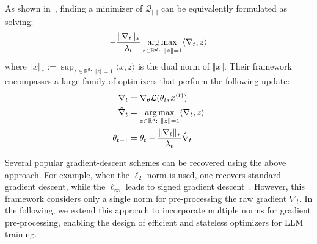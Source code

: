 As shown in~\citep{bernstein2024old}, finding a minimizer of $\mathcal{Q}_{\Vert\cdot\Vert}$ can be equivalently formulated as solving:
\begin{align}
\label{eq-steepest}
  -\frac{\Vert \nabla_t\Vert_{*}}{\lambda_t} \operatorname*{arg\,max}_{z\in\mathbb{R}^d:~\Vert z\Vert= 1} \langle \nabla_t, z\rangle 
\end{align}
where $\Vert x \Vert_{*}:=\sup_{z\in\mathbb{R}^d:~\Vert z\Vert= 1} \langle x, z\rangle$ is the dual norm of $\Vert x\Vert$. Their framework encompasses a large family of optimizers that perform the following update: 
\begin{equation}
\begin{aligned}
\label{eq:single-norm}
    \nabla_t &= \nabla_{\theta} \mathcal{L}(\theta_t, x^{(t)}) \\
\hat{\nabla}_t &=\operatorname*{arg\,max}_{z\in\mathbb{R}^d:~\Vert z\Vert= 1} \langle \nabla_t, z\rangle\\
\theta_{t+1} &= \theta_t -\frac{\Vert \nabla_t\Vert_{*}}{\lambda_t}\hat{\nabla}_t
\end{aligned}
\end{equation}

Several popular gradient-descent schemes can be recovered using the above approach. For example, when the $\ell_2$-norm is used, one recovers standard gradient descent, while the $\ell_{\infty}$ leads to signed gradient descent~\citep{carlson2015stochastic}. However, this framework considers only  a single norm for pre-processing the raw gradient $\nabla_t$. In the following, we extend this approach to incorporate multiple norms for gradient pre-processing, enabling the design of efficient and stateless optimizers for LLM training. 


